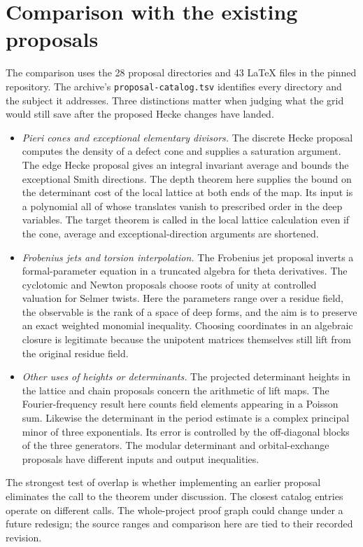 \documentclass[11pt,letterpaper]{article}
\begin{document}
\section{Comparison with the existing proposals}
The comparison uses the 28 proposal directories and 43 LaTeX files in the pinned repository. The archive's \texttt{proposal-catalog.tsv} identifies every directory and the subject it addresses. Three distinctions matter when judging what the grid would still save after the proposed Hecke changes have landed.
\begin{itemize}
\item \emph{Pieri cones and exceptional elementary divisors.} The discrete Hecke proposal computes the density of a defect cone and supplies a saturation argument. The edge Hecke proposal gives an integral invariant average and bounds the exceptional Smith directions. The depth theorem here supplies the bound on the determinant cost of the local lattice at both ends of the map. Its input is a polynomial all of whose translates vanish to prescribed order in the deep variables. The target theorem is called in the local lattice calculation even if the cone, average and exceptional-direction arguments are shortened.
\item \emph{Frobenius jets and torsion interpolation.} The Frobenius jet proposal inverts a formal-parameter equation in a truncated algebra for theta derivatives. The cyclotomic and Newton proposals choose roots of unity at controlled valuation for Selmer twists. Here the parameters range over a residue field, the observable is the rank of a space of deep forms, and the aim is to preserve an exact weighted monomial inequality. Choosing coordinates in an algebraic closure is legitimate because the unipotent matrices themselves still lift from the original residue field.
\item \emph{Other uses of heights or determinants.} The projected determinant heights in the lattice and chain proposals concern the arithmetic of lift maps. The Fourier-frequency result here counts field elements appearing in a Poisson sum. Likewise the determinant in the period estimate is a complex principal minor of three exponentials. Its error is controlled by the off-diagonal blocks of the three generators. The modular determinant and orbital-exchange proposals have different inputs and output inequalities.
\end{itemize}
The strongest test of overlap is whether implementing an earlier proposal eliminates the call to the theorem under discussion. The closest catalog entries operate on different calls. The whole-project proof graph could change under a future redesign; the source ranges and comparison here are tied to their recorded revision.
\end{document}
